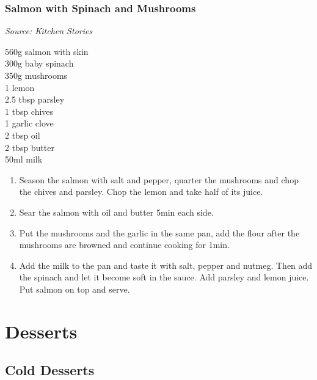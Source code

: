\documentclass{report}
\begin{document}
\section{Salmon with Spinach and Mushrooms}
\textit{Source: Kitchen Stories}\\
\begin{minipage}[t]{0.21\textwidth} \vspace{0pt} 
560g salmon with skin\\
300g baby spinach\\
350g mushrooms\\
1 lemon\\
2.5 tbsp parsley\\
1 tbsp chives\\
1 garlic clove\\
2 tbsp oil\\
2 tbsp butter\\
50ml milk
\end{minipage}
\hfill
\begin{minipage}[t]{0.78\textwidth} \vspace{0pt}
	\begin{enumerate}
		\item Season the salmon with salt and pepper, quarter the mushrooms and chop the chives and parsley. Chop the lemon and take half of its juice.
		\item Sear the salmon with oil and butter 5min each side.
		\item Put the mushrooms and the garlic in the same pan, add the flour after the mushrooms are browned and continue cooking for 1min.
		\item Add the milk to the pan and taste it with salt, pepper and nutmeg. Then add the spinach and let it become soft in the sauce. Add parsley and lemon juice. Put salmon on top and serve.
	\end{enumerate}	
\end{minipage}

\part{Desserts}

\chapter{Cold Desserts}
\end{document}
